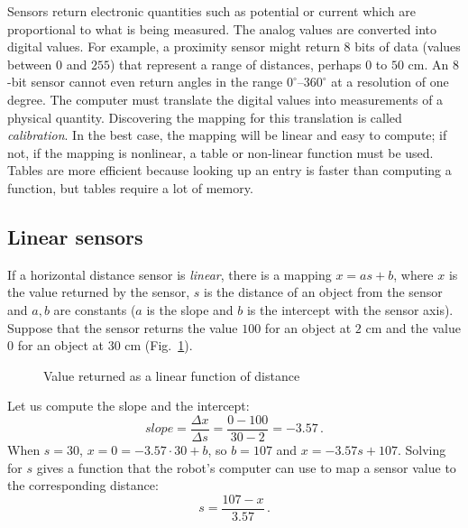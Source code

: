 Sensors return electronic quantities such as potential or current which are proportional to what is being measured. The analog values are converted into digital values. For example, a proximity sensor might return $8$ bits of data (values between $0$ and $255$) that represent a range of distances, perhaps $0$ to $50$ cm. An $8$-bit sensor cannot even return angles in the range $0^\circ$--$360^\circ$ at a resolution of one degree. The computer must translate the digital values into measurements of a physical quantity. Discovering the mapping for this translation is called \emph{calibration}. In the best case, the mapping will be linear and easy to compute; if not, if the mapping is nonlinear, a table or non-linear function must be used. Tables are more efficient because looking up an entry is faster than computing a function, but tables require a lot of memory.

\subsection{Linear sensors}

If a horizontal distance sensor is \emph{linear}, there is a mapping $x = a s + b$, where $x$ is the value returned by the sensor, $s$ is the distance of an object from the sensor and $a,b$ are constants ($a$ is the slope and $b$ is the intercept with the sensor axis). Suppose that the sensor returns the value $100$ for an object at $2$ cm and the value $0$ for an object at $30$ cm (Fig.~\ref{fig.linear}).

\begin{figure}
\begin{center}
\caption{Value returned as a linear function of distance}\label{fig.linear}
\end{center}
\end{figure}

Let us compute the slope and the intercept:
\[
\mathit{slope} = \frac{\Delta x}{\Delta s} = \frac{0-100}{30-2}=-3.57\,.
\]
When $s=30$, $x=0=-3.57\cdot 30+b$, so $b=107$ and $x = -3.57 s + 107$. Solving for $s$ gives a function that the robot's computer can use to map a sensor value to the corresponding distance:
\[
s = \frac{107-x}{3.57}\,.
\]

